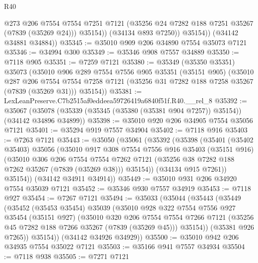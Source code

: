 \begin{lexlean}{R40}
\begin{coremodule}
                @273
                @206
                @7554
                @7554
                @7251
                @7121
                (@35256 @24 @7282 @188 @7251 @35267 (@7839 (@35269 @24)))
                @35154))
            (@34134 @893 @7250))
          @35154))
      (@34142 @34881 @34884))
@35345 := @35010 @909 @206 @34890 @7554 @35073 @7121
@35346 := @34994 @300
@35349 := @35346 @908 @7557 @34889
@35350 := @7118 @905
@35351 := @7259 @7121
@35380 := @35349
    (@35350 @35351)
    @35073
    (@35010
      @906
      @289
      @7554
      @7556
      @905
      @35351
      (@35151 @905)
      (@35010
        @287
        @206
        @7554
        @7554
        @7258
        @7121
        (@35256 @31 @7282 @188 @7258 @35267 (@7839 (@35269 @31)))
        @35154))
@35381 := LexLeanPreserve.C7b2515af0eddeea59726419a6840f51f.R40.__rel_8
@35392 := @35067
    (@35078 (@35339 (@35345 (@35380 (@35381 @904 @7257)) @35154)) (@34142 @34896 @34899))
@35398 := @35010 @920 @206 @34905 @7554 @35056 @7121
@35401 := @35294 @919 @7557 @34904
@35402 := @7118 @916
@35403 := @7263 @7121
@35443 := @35050
    (@35061
      (@35392
        (@35398
          (@35401
            (@35402 @35403)
            @35056
            (@35010
              @917
              @308
              @7554
              @7556
              @916
              @35403
              (@35151 @916)
              (@35010
                @306
                @206
                @7554
                @7554
                @7262
                @7121
                (@35256 @38 @7282 @188 @7262 @35267 (@7839 (@35269 @38)))
                @35154))
            (@34134 @915 @7261))
          @35154))
      (@34142 @34911 @34914))
@35449 := @35010 @931 @206 @34920 @7554 @35039 @7121
@35452 := @35346 @930 @7557 @34919
@35453 := @7118 @927
@35454 := @7267 @7121
@35494 := @35033
    (@35044
      (@35443
        (@35449
          (@35452
            (@35453 @35454)
            @35039
            (@35010
              @928
              @322
              @7554
              @7556
              @927
              @35454
              (@35151 @927)
              (@35010
                @320
                @206
                @7554
                @7554
                @7266
                @7121
                (@35256 @45 @7282 @188 @7266 @35267 (@7839 (@35269 @45)))
                @35154))
            (@35381 @926 @7265))
          @35154))
      (@34142 @34926 @34929))
@35500 := @35010 @942 @206 @34935 @7554 @35022 @7121
@35503 := @35166 @941 @7557 @34934
@35504 := @7118 @938
@35505 := @7271 @7121

\end{coremodule}
\end{lexlean}
